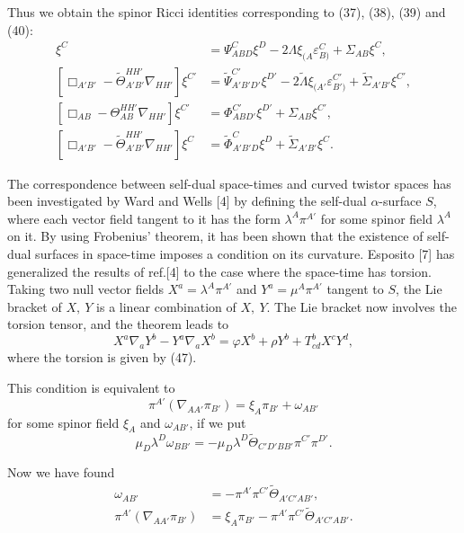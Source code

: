 \documentclass[a4paper,12pt]{article}
\begin{document}
Thus we obtain the spinor Ricci identities corresponding to (37), (38), (39) and (40):
\begin{align}
[\Box_{AB}-\Theta_{AB}^{HH'}\nabla_{HH'}]\xi^C &= \Psi_{ABD}^C\xi^D-2\Lambda\xi_{(A}\varepsilon_{B)}^C+\Sigma_{AB}\xi^C,\\ 
[\Box_{A'B'}-\tilde\Theta_{A'B'}^{HH'}\nabla_{HH'}]\xi^{C'} &= \tilde\Psi_{A'B'D'}^{C'}\xi^{D'}-2\tilde\Lambda\xi_{(A'}\varepsilon_{B')}^{C'}+\tilde\Sigma_{A'B'}\xi^{C'},\\ 
[\Box_{AB}-\Theta_{AB}^{HH'}\nabla_{HH'}]\xi^{C'} &= \Phi_{ABD'}^{C'}\xi^{D'}+\Sigma_{AB}\xi^{C'},\\
[\Box_{A'B'}-\tilde\Theta_{A'B'}^{HH'}\nabla_{HH'}]\xi^{C} &= \tilde\Phi_{A'B'D}^{C}\xi^{D}+\tilde\Sigma_{A'B'}\xi^{C}.
\end{align}

The correspondence between self-dual space-times and curved twistor spaces has been investigated by Ward and Wells [4] by defining the self-dual $\alpha$-surface $S$, where each vector field tangent to it has the form $\lambda^A\pi^{A'}$ for some spinor field $\lambda^A$ on it. By using Frobenius' theorem, it has been shown that the existence of self-dual surfaces in space-time imposes a condition on its curvature. Esposito [7] has generalized the results of ref.[4] to the case where the space-time has torsion. Taking two null vector fields $X^a=\lambda^A\pi^{A'}$ and $Y^a=\mu^A\pi^{A'}$ tangent to $S$, the Lie bracket of $X,\ Y$ is a linear combination of $X,\ Y$. The Lie bracket now involves the torsion tensor, and the theorem leads to
\begin{equation}
X^a\nabla_aY^b-Y^a\nabla_aX^b=\varphi X^b+\rho Y^b+T_{cd}^bX^cY^d,  
\end{equation}
 where the torsion is given by (47).

This condition is equivalent to
\begin{equation}
\pi^{A'}(\nabla_{AA'}\pi_{B'})=\xi_A\pi_{B'}+\omega_{AB'}
\end{equation}
for some spinor field $\xi_A$ and $\omega_{AB'}$, if we put
\begin{equation}
\mu_D\lambda^D\omega_{BB'}=-\mu_D\lambda^D\tilde\Theta_{C'D'BB'}\pi^{C'}\pi^{D'}.\end{equation}

Now we have found 
\begin{align}
\omega_{AB'}&=-\pi^{A'}\pi^{C'}\tilde\Theta_{A'C'AB'},\\
\pi^{A'}(\nabla_{AA'}\pi_{B'})&=\xi_A\pi_{B'}-\pi^{A'}\pi^{C'}\tilde\Theta_{A'C'AB'}.
\end{align}
\end{document}
